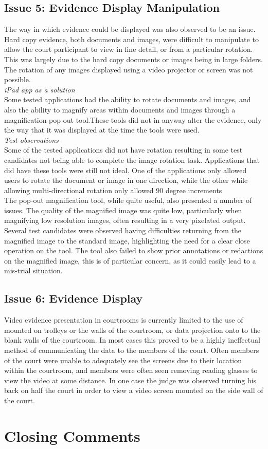 \documentclass{article}
\begin{document}
\subsection{Issue 5: Evidence Display Manipulation}
The way in which evidence could be displayed was also observed to be an issue. Hard copy evidence, both documents and images, were difficult to manipulate to allow the court participant to view in fine detail, or from a particular rotation. This was largely due to the hard copy documents or images being in large folders. The rotation of any images displayed using a video projector or screen was not possible.\\
\textit{iPad app as a solution}\\
Some tested applications had the ability to rotate documents and images, and also the ability to magnify areas within documents and images through a magnification pop-out tool.These tools did not in anyway alter the evidence, only the way that it was displayed at the time the tools were used.\\
\textit{Test observations}\\
Some of the tested applications did not have rotation resulting in some test candidates not being able to complete the image rotation task. Applications that did have these tools were still not ideal. One of the applications only allowed users to rotate the document or image in one direction, while the other while allowing multi-directional rotation only allowed 90 degree increments\\
The pop-out magnification tool, while quite useful, also presented a number of issues. The quality of the magnified image was quite low, particularly when magnifying low resolution images, often resulting in a very pixelated output. Several test candidates were observed having difficulties returning from the magnified image to the standard image, highlighting the need for a clear close operation on the tool. The tool also failed to show prior annotations or redactions on the magnified image, this is of particular concern, as it could easily lead to a mis-trial situation.

\subsection{Issue 6: Evidence Display}
Video evidence presentation in courtrooms is currently limited to the use of  mounted on trolleys or the walls of the courtroom, or data projection onto to the blank walls of the courtroom. In most cases this proved to be a highly ineffectual method of communicating the data to the members of the court. Often members of the court were unable to adequately see the screens due to their location within the courtroom, and members were often  seen removing reading glasses to view the video at some distance. In one case the judge was observed turning his back on half the court in order to view a video screen mounted on the side wall of the court.

\section{Closing Comments}
\end{document}
